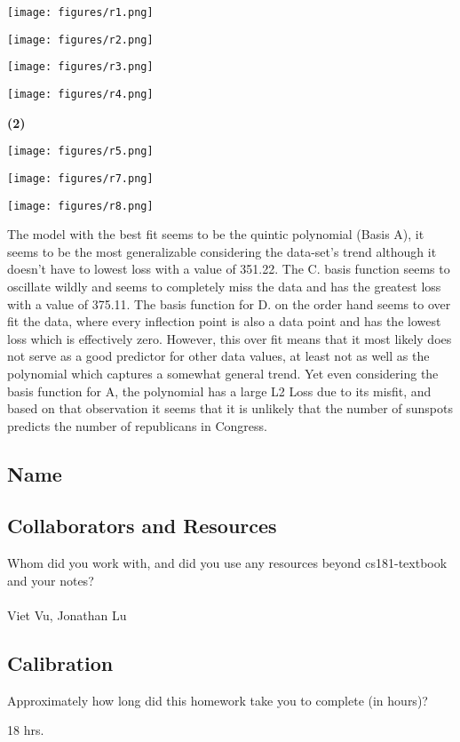 \documentclass[submit]{harvardml}
\begin{document}
\texttt{[image: figures/r1.png]}

\texttt{[image: figures/r2.png]}

\texttt{[image: figures/r3.png]}

\texttt{[image: figures/r4.png]}

\textbf{(2)}


\texttt{[image: figures/r5.png]}

\texttt{[image: figures/r7.png]}

\texttt{[image: figures/r8.png]}

\begin{tcolorbox}[breakable]

The model with the best fit seems to be the quintic polynomial (Basis A), it seems to be the most generalizable considering the data-set's trend although it doesn't have to lowest loss with a value of 351.22. The C. basis function seems to oscillate wildly and seems to completely miss the data and has the greatest loss with a value of 375.11. The basis function for D. on the order hand seems to over fit the data, where every inflection point is also a data point and has the lowest loss which is effectively zero. However, this over fit means that it most likely does not serve as a good predictor for other data values, at least not as well as the polynomial which captures a somewhat general trend. Yet even considering the basis function for A, the polynomial has a large L2 Loss due to its misfit, and based on that observation it seems that it is unlikely that the number of sunspots predicts the number of republicans in Congress.

\end{tcolorbox}


\newpage
\subsection*{Name}

\subsection*{Collaborators and Resources}
Whom did you work with, and did you use any resources beyond cs181-textbook and your notes?\\\\

Viet Vu, Jonathan Lu

\subsection*{Calibration}
Approximately how long did this homework take you to complete (in hours)? 

18 hrs.
\end{document}
